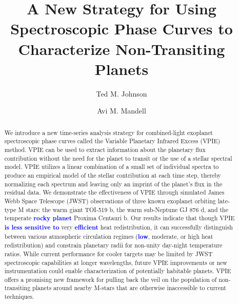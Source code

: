 \documentclass[twocolumn,linenumbers]{aastex7}
\newcommand{\update}[1]{\textcolor{blue}{\bf #1}}
\begin{document}
\title{A New Strategy for Using Spectroscopic Phase Curves to Characterize Non-Transiting Planets}



\author[0000-0002-1570-2203]{Ted M. Johnson}
\author[0000-0002-8119-3355]{Avi M. Mandell}

\begin{abstract}
We introduce a new time-series analysis strategy for combined-light exoplanet spectroscopic phase curves called the Variable Planetary Infrared Excess (VPIE) method.  VPIE can be used to extract information about the planetary flux contribution without the need for the planet to transit or the use of a stellar spectral model. VPIE utilizes a linear combination of a small set of individual spectra to produce an empirical model of the stellar contribution at each time step, thereby normalizing each spectrum and leaving only an imprint of the planet's flux in the residual data. We demonstrate the effectiveness of VPIE through simulated James Webb Space Telescope (JWST) observations of three known exoplanet orbiting late-type M stars: the warm giant TOI-519 b, the warm sub-Neptune GJ 876 d, and the temperate \update{rocky planet} Proxima Centauri b. Our results indicate that though VPIE \update{is less sensitive to} very \update{efficient} heat redistribution, it can successfully distinguish between various atmospheric circulation regimes (\update{low}, moderate, or high heat redistribution) and constrain planetary radii for non-unity day-night temperature ratios. While current performance for cooler targets may be limited by JWST spectroscopic capabilities at longer wavelengths, future VPIE improvements or new instrumentation could enable characterization of potentially habitable planets. VPIE offers a promising new framework for pulling back the veil on the population of non-transiting planets around nearby M-stars that are otherwise inaccessible to current techniques.
\end{abstract}
\end{document}
